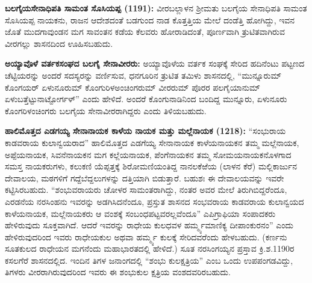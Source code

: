 \textbf{ಬಲಗೈಯಸೇನಾಧಿಪತಿ ಸಾಮಂತ ಸೊಸಿಯಪ್ಪ (1191):} ವೀರಬಲ್ಲಾಳನ ಶ‍್ರೀಮತು ಬಲಗೈಯ ಸೇನಾಧಿಪತಿ ಸಾಮಂತ ಸೊಸಿಯಪ್ಪ ನಾಯಕನು, ರಾಜನ ಆದೇಶದಂತೆ ಬಡಗುಂದ ನಾಡ ಕೊತ್ತತ್ತಿಯ ಮೇಲೆ ದಂಡೆತ್ತಿ ಹೋಗಿದ್ದು, ಇವನ ಜೊತೆ ಮುದಗಾವುಂಡನ ಮಗ ಸಾವಂತನ ಕಡೆಯ ಕೆಲವರು ಹೋರಾಡಿದಂತೆ, ಪೂರ್ಣವಾಗಿ ತ್ರುಟಿತವಾಗಿರುವ ವೀರಗಲ್ಲು ಶಾಸನದಿಂದ ಊಹಿಸಬಹುದು.

\vskip 2pt

\textbf{ಅಯ್ಯಾವೊಳೆ ವರ್ತಕಸಂಘದ ಬಲಗೈ ಸೇನಾವೀರರು:} ಅಯ್ಯಾವೊಳೆಯ ವರ್ತಕ ಸಂಘಕ್ಕೆ ಸೇರಿದ ಹದಿನೆಂಟು ಪಟ್ಟಣದ ಚೆಟ್ಟಿಯರನ್ನು ಅಂದರೆ ಸದಸ್ಯರನ್ನು ವರ್ಣಿಸುವ, ಧನಗೂರಿನ ತ್ರುಟಿತ ತಮಿಳು ಶಾಸನದಲ್ಲಿ, “ಮುನ್ನೂರುಮ್ ಕೊಂಗಯರ್​ ಏಳುನೂರುಮ್ ಕೊಂಗುರಿಳಅಂಚಿಂಗರುಮ್ ವೀರರುಮ್ ಪೊರರ ಪಲಗೈಯಾನುಮ್ ಏಳುಬತ್ತೆಟ್ಟು\break ನಾಟ್ಟೋರ್ಗಳ್​” ಎಂದು ಹೇಳಿದೆ. ಅಂದರೆ ಕೊಂಗುನಾಡಿನಿಂದ ಬಂದಿದ್ದ ಮುನ್ನೂರು, ಏಳುನೂರು ಕೊಂಗರಿಳಂಚಿಂಗರು ಬಲಗೈಯ ಸೇನಾವೀರರಾಗಿದ್ದರು ಎಂದು ತಿಳಿಯಬಹುದು.

\textbf{ಹಾಲಿಮೊತ್ತದ ಎಡಗಯ್ಯ ಸೇನಾನಾಯಕ ಕಾಳೆಯ ನಾಯಕ ಮತ್ತು ಮಲ್ಲೆನಾಯಕ (1218):} “ಸಂಭುರಾಯ ಕಾಡವರಾಯ ಕುಲಾನ್ವಯರಾದ” ಹಾಲಿಮೊತ್ತದ ಎಡಗೆಯ್ಯ ಸೇನಾನಾಯಕ ಕಾಳೆಯನಾಯಕನ ತಮ್ಮ ಮಲ್ಲೆನಾಯಕ, ಅಪ್ಪೆಯನಾಯಕ, ಸಿವನೆನಾಯಕನ ಮಗ ಕಲ್ಲೆಯನಾಯಕ, ಪೆಂಗೆನಾಯಕನ ತಮ್ಮ ಸೋಮಯನಾಯಕನೊಳಗಾದ ಸಮಸ್ತ ನಾಯಕರುಗಳು, ಕಲುಕಣಿ ಯೆಪ್ಪತ್ತಕ್ಕೆ ಶಿರೋಮಣಿಯಂತಿದ್ದ ನಾನಲಕೆಱೆಯ (ಲಾಳನ ಕೆರೆ) ಮಲ್ಲಿಕಾರ್ಜುನ ದೇವಾಲಯ, ಮಠಗಳಿಗೆ ಗದ್ದೆಬೆದ್ದಲುಗಳನ್ನು ದತ್ತಿಯಾಗಿ ಬಿಡುತ್ತಾರೆ. ಬಹುಶಃ ಈ ದೇವಾಲಯವನ್ನು ಇವರೇ ಕಟ್ಟಿಸಿರಬಹುದು. “ಶಂಭುವರಾಯರು ಚೋಳರ ಸಾಮಂತರಾಗಿದ್ದು, ನಂತರ ಅವರ ಮೇಲೆ ತಿರುಗಿಬಿದ್ದರೆಂದೂ, ಎರಡನೆಯ ನರಸಿಂಹನು ಇವರನ್ನು ಅಡಗಿಸಿದನೆಂದೂ, ಪ್ರಸ್ತುತ ಶಾಸನದ ಸಂಭವರಾಯ ಕಾಡವರಾಯ ಕುಲಾನ್ವಯದ ಕಾಳೆಯನಾಯಕ, ಮಲ್ಲೆ\-ನಾಯಕರು ಆ ವಂಶಕ್ಕೆ ಸಂಬಂಧಪಟ್ಟವ\-ರಲ್ಲವೆಂದೂ” ಎಪಿಗ್ರಾಫಿಯಾ ಸಂಪಾದಕರು ಹೇಳಿರುವುದು ಸೂಕ್ತವಾಗಿದೆ. ಆದರೆ ಇವರನ್ನು ರಾಧೇಯ ಕುಲಧವಳ ಹರ್ಮ್ಮ್ಯಮಾಣಿಕ್ಯ ದೀಪಾಂಕುರನಂ” ಎಂದು ಹೇಳಿರುವುದರಿಂದ ಇವರು ರಾಧೇಯಕುಲ ಅಥವಾ ಹರ್ಮ್ಮ್ಯ ಕುಲಕ್ಕೆ ಸೇರಿದವ\-ರೆಂದು ಹೇಳಬಹುದು. (ಕರ್ಣನು ಸೂತಕುಲದ ರಾಧೇಯನ ಮಗನೆಂದು ಮಹಾಭಾರತ\-ದಲ್ಲಿ ಹೇಳಿದೆ.) ಸೂತ ನರಸಿಂಗಯ್ಯನ ಪ್ರಸ್ತಾವ ಕ್ರಿ.ಶ.1190ರ ಕಸಲಗೆರೆ ಶಾಸನದಲ್ಲಿದ. ಇಂದಿನ ತಿಗಳ ಜನಾಂಗದಲ್ಲಿ “ಶಂಭು ಕುಲಕ್ಷತ್ರಿಯ” ಎಂಬ ಒಂದು ಉಪಪಂಗಡವಿದ್ದು, ತಿಗಳರು ವೀರರಾಗಿರುವುದರಿಂದ ಇವರು ಈ ಶಂಭುಕುಲ ಕ್ಷತ್ರಿಯ ವಂಶದವರಿರಬಹುದು.

